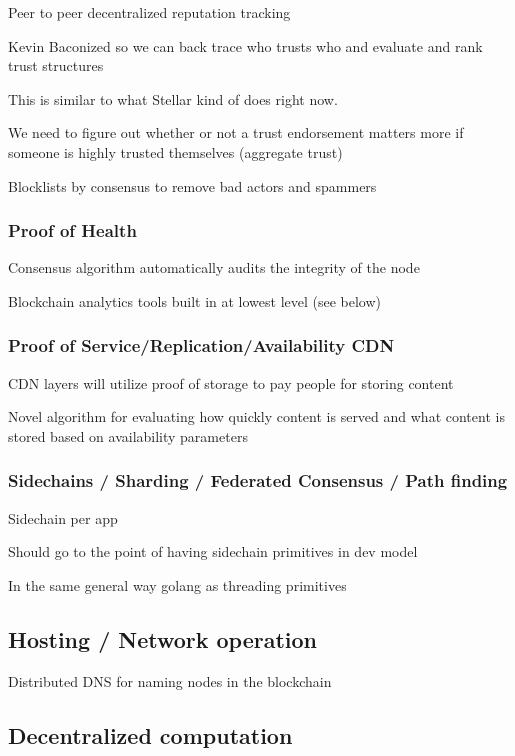 \documentclass[11pt]{article}
\begin{document}
Peer to peer decentralized reputation tracking


Kevin Baconized so we can back trace who trusts who and evaluate and rank trust structures


This is similar to what Stellar kind of does right now.


We need to figure out whether or not a trust endorsement matters more if someone is highly trusted themselves (aggregate trust)


Blocklists by consensus to remove bad actors and spammers


\subsubsection{Proof of Health}

Consensus algorithm automatically audits the integrity of the node


Blockchain analytics tools built in at lowest level (see below)


\subsubsection{Proof of Service/Replication/Availability CDN}

CDN layers will utilize proof of storage to pay people for storing content


Novel algorithm for evaluating how quickly content is served and what content is stored based on availability parameters


\subsubsection{Sidechains / Sharding / Federated Consensus / Path finding}

Sidechain per app


Should go to the point of having sidechain primitives in dev model


In the same general way golang as threading primitives


\subsection{Hosting / Network operation}

Distributed DNS for naming nodes in the blockchain


\subsection{Decentralized computation}
\end{document}

